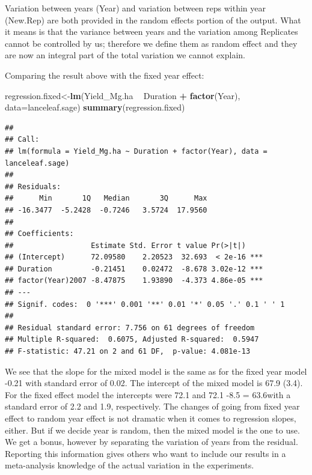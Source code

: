 \documentclass[letterpaper,]{book}
\newenvironment{Shaded}{\begin{snugshade}}{\end{snugshade}}
\newcommand{\DataTypeTok}[1]{\textcolor[rgb]{0.13,0.29,0.53}{#1}}
\newcommand{\KeywordTok}[1]{\textcolor[rgb]{0.13,0.29,0.53}{\textbf{#1}}}
\newcommand{\NormalTok}[1]{#1}
\newcommand{\OperatorTok}[1]{\textcolor[rgb]{0.81,0.36,0.00}{\textbf{#1}}}
\newcommand{\StringTok}[1]{\textcolor[rgb]{0.31,0.60,0.02}{#1}}
\begin{document}
Variation between years (Year) and variation between reps within year (New.Rep) are both provided in the random effects portion of the output. What it means is that the variance between years and the variation among Replicates cannot be controlled by us; therefore we define them as random effect and they are now an integral part of the total variation we cannot explain.

Comparing the result above with the fixed year effect:

\begin{Shaded}
\begin{Highlighting}[]
\NormalTok{regression.fixed<-}\KeywordTok{lm}\NormalTok{(Yield_Mg.ha }\OperatorTok{~}\StringTok{ }\NormalTok{Duration }\OperatorTok{+}\StringTok{ }\KeywordTok{factor}\NormalTok{(Year), }\DataTypeTok{data=}\NormalTok{lanceleaf.sage)}
\KeywordTok{summary}\NormalTok{(regression.fixed)}
\end{Highlighting}
\end{Shaded}

\begin{verbatim}
## 
## Call:
## lm(formula = Yield_Mg.ha ~ Duration + factor(Year), data = lanceleaf.sage)
## 
## Residuals:
##      Min       1Q   Median       3Q      Max 
## -16.3477  -5.2428  -0.7246   3.5724  17.9560 
## 
## Coefficients:
##                  Estimate Std. Error t value Pr(>|t|)    
## (Intercept)      72.09580    2.20523  32.693  < 2e-16 ***
## Duration         -0.21451    0.02472  -8.678 3.02e-12 ***
## factor(Year)2007 -8.47875    1.93890  -4.373 4.86e-05 ***
## ---
## Signif. codes:  0 '***' 0.001 '**' 0.01 '*' 0.05 '.' 0.1 ' ' 1
## 
## Residual standard error: 7.756 on 61 degrees of freedom
## Multiple R-squared:  0.6075, Adjusted R-squared:  0.5947 
## F-statistic: 47.21 on 2 and 61 DF,  p-value: 4.081e-13
\end{verbatim}

We see that the slope for the mixed model is the same as for the fixed year model -0.21 with standard error of 0.02. The intercept of the mixed model is 67.9 (3.4). For the fixed effect model the intercepts were 72.1 and 72.1 -8.5 = 63.6with a standard error of 2.2 and 1.9, respectively. The changes of going from fixed year effect to random year effect is not dramatic when it comes to regression slopes, either. But if we decide year is random, then the mixed model is the one to use. We get a bonus, however by separating the variation of years from the residual. Reporting this information gives others who want to include our results in a meta-analysis knowledge of the actual variation in the experiments.
\end{document}
